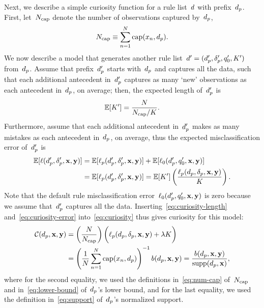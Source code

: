 Next, we describe a simple curiosity function for a rule list~${d}$ with prefix~$d_p$.
%
First, let~$N_{\textnormal{cap}}$ denote the number of observations captured by~$d_p$, \ie
\begin{align}
N_{\textnormal{cap}} \equiv \sum_{n=1}^N \textnormal{cap}(x_n, d_p).
\label{eq:num-cap}
\end{align}
We now describe a model that generates another
rule list~${{d}' = (d_p', \delta_p', q_0', K')}$ from~$d_p$.
%
Assume that prefix~$d_p'$ starts with~$d_p$ and captures all the data,
such that each additional antecedent in~$d_p'$
captures as many `new' observations as each antecedent in~$d_p$, on average;
then, the expected length of~$d_p'$ is
\begin{align}
\mathbb{E}[ K' ] = \frac{N}{N_{\textnormal{cap}} / K}.
\label{eq:curiosity-length}
\end{align}
Furthermore, assume that each additional antecedent in~$d_p'$
makes as many mistakes as each antecedent in~$d_p$, on average,
thus the expected misclassification error of~$d_p'$ is
\begin{align}
\mathbb{E}[\ell(d_p', \delta_p', \mathbf{x}, \mathbf{y})]
&= \mathbb{E}[\ell_p(d_p', \delta_p', \mathbf{x}, \mathbf{y})] + \mathbb{E}[\ell_0(d_p', q_0', \mathbf{x}, \mathbf{y})] \nonumber \\
&= \mathbb{E}[\ell_p(d_p', \delta_p', \mathbf{x}, \mathbf{y})]
=  \mathbb{E}[ K' ] \left(\frac{\ell_p(d_p, \delta_p, \mathbf{x}, \mathbf{y})}{K}\right).
\label{eq:curiosity-error}
\end{align}
Note that the default rule misclassification error~$\ell_0(d_p', q_0', \mathbf{x}, \mathbf{y})$
is zero because we assume that~$d_p'$ captures all the data.
%
Inserting~\eqref{eq:curiosity-length} and~\eqref{eq:curiosity-error}
into~\eqref{eq:curiosity} thus gives curiosity for this model:
\begin{align*}
\mathcal{C}(d_p, \mathbf{x}, \mathbf{y})
&= \left( \frac{N}{N_{\textnormal{cap}}} \right) \biggl(\ell_p(d_p, \delta_p, \mathbf{x}, \mathbf{y}) + {\lambda} K \biggr) \\
&= \left( \frac{1}{N} \sum_{n=1}^N \textnormal{cap}(x_n, d_p) \right)^{-1} b(d_p, \mathbf{x}, \mathbf{y})
= \frac{b(d_p, \mathbf{x}, \mathbf{y})}{\textnormal{supp}(d_p, \mathbf{x})},
\end{align*}
where for the second equality, we used the definitions in~\eqref{eq:num-cap} of~$N_{\textnormal{cap}}$
and in~\eqref{eq:lower-bound} of~$d_p$'s lower bound, and for the last equality,
we used the definition in~\eqref{eq:support} of~$d_p$'s normalized support.

